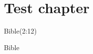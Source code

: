 \documentclass[twoside,14pt,onecolumn,openright ,a4paper]{memoir}
\begin{document}
\chapter{Test chapter}
\begin{pairs}
  \begin{Leftside}
    \beginnumbering
    \pstart
    \lipsum[1] Bible(2:12)
    \lipsum[1]
    \pend
    \endnumbering
  \end{Leftside}
  \begin{Rightside}
    \beginnumbering
    \pstart
    \lipsum[1] Bible
    \lipsum[1]
    \pend
    \endnumbering
  \end{Rightside}
\end{pairs}
\Columns 
\backmatter 
\printindex[bible]
\end{document}
